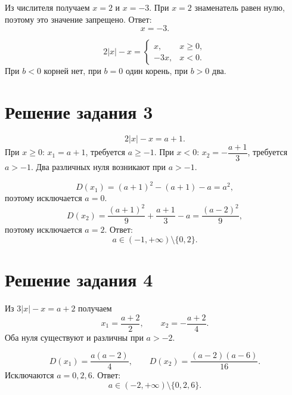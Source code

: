 \clearpage
{}

\begin{teacheranswer}[Задание 1]
  Из числителя получаем \(x=2\) и \(x=-3\). При \(x=2\) знаменатель
  равен нулю, поэтому это значение запрещено. Ответ:
  \[
    \boxed{x=-3}.
  \]
\end{teacheranswer}

\begin{teacheranswer}[Задание 2]
  \[
    2|x|-x=
    \begin{cases}
      x,&x\ge0,\\
      -3x,&x<0.
    \end{cases}
  \]
  При \(b<0\) корней нет, при \(b=0\) один корень, при \(b>0\) два.
\end{teacheranswer}

\section*{Решение задания 3}

\begin{teacheranswer}[Числитель]
  \[
    2|x|-x=a+1.
  \]
  При \(x\ge0\): \(x_1=a+1\), требуется \(a\ge-1\).
  При \(x<0\): \(x_2=-\dfrac{a+1}{3}\), требуется \(a>-1\).
  Два различных нуля возникают при \(a>-1\).
\end{teacheranswer}

\begin{teacheranswer}
  \[
    D(x_1)=(a+1)^2-(a+1)-a=a^2,
  \]
  поэтому исключается \(a=0\).
  \[
    D(x_2)=\frac{(a+1)^2}{9}+\frac{a+1}{3}-a
           =\frac{(a-2)^2}{9},
  \]
  поэтому исключается \(a=2\). Ответ:
  \[
    \boxed{a\in(-1,+\infty)\setminus\{0,2\}}.
  \]
\end{teacheranswer}

\section*{Решение задания 4}

\begin{teacheranswer}[Числитель]
  Из \(3|x|-x=a+2\) получаем
  \[
    x_1=\frac{a+2}{2},
    \qquad
    x_2=-\frac{a+2}{4}.
  \]
  Оба нуля существуют и различны при \(a>-2\).
\end{teacheranswer}

\begin{teacheranswer}
  \[
    D(x_1)=\frac{a(a-2)}4,
    \qquad
    D(x_2)=\frac{(a-2)(a-6)}{16}.
  \]
  Исключаются \(a=0,2,6\). Ответ:
  \[
    \boxed{a\in(-2,+\infty)\setminus\{0,2,6\}}.
  \]
\end{teacheranswer}

